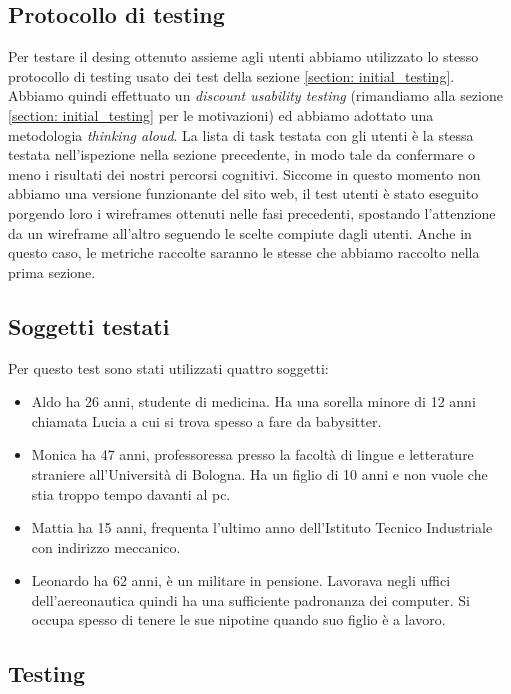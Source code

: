 \documentclass[../Report.tex]{subfiles}
\begin{document}
    \subsection{Protocollo di testing}
    Per testare il desing ottenuto assieme agli utenti abbiamo utilizzato lo stesso protocollo di testing usato dei test della sezione \ref*{section: initial_testing}. Abbiamo quindi effettuato un \emph{discount usability testing} (rimandiamo alla sezione \ref{section: initial_testing} per le motivazioni) ed abbiamo adottato una metodologia \emph{thinking aloud}. La lista di task testata con gli utenti è la stessa testata nell'ispezione nella sezione precedente, in modo tale da confermare o meno i risultati dei nostri percorsi cognitivi. Siccome in questo momento non abbiamo una versione funzionante del sito web, il test utenti è stato eseguito porgendo loro i wireframes ottenuti nelle fasi precedenti, spostando l'attenzione da un wireframe all'altro seguendo le scelte compiute dagli utenti. Anche in questo caso, 
    le metriche raccolte saranno le stesse che abbiamo raccolto nella prima sezione.
    \subsection{Soggetti testati}
    Per questo test sono stati utilizzati quattro soggetti:
    \begin{itemize}
        \item Aldo ha 26 anni, studente di medicina. Ha una sorella minore di 12 anni chiamata Lucia a cui si trova spesso a fare da babysitter.
        \item Monica ha 47 anni, professoressa presso la facoltà di lingue e letterature straniere all'Università di Bologna. Ha un figlio di 10 anni e non vuole che stia troppo tempo davanti al pc. 
        \item Mattia ha 15 anni, frequenta l'ultimo anno dell'Istituto Tecnico Industriale con indirizzo meccanico.
        \item Leonardo ha 62 anni, è un militare in pensione. Lavorava negli uffici dell'aereonautica quindi ha una sufficiente padronanza dei computer. Si occupa spesso di tenere le sue nipotine quando suo figlio è a lavoro. 
    \end{itemize}
    \subsection{Testing}
\end{document}
